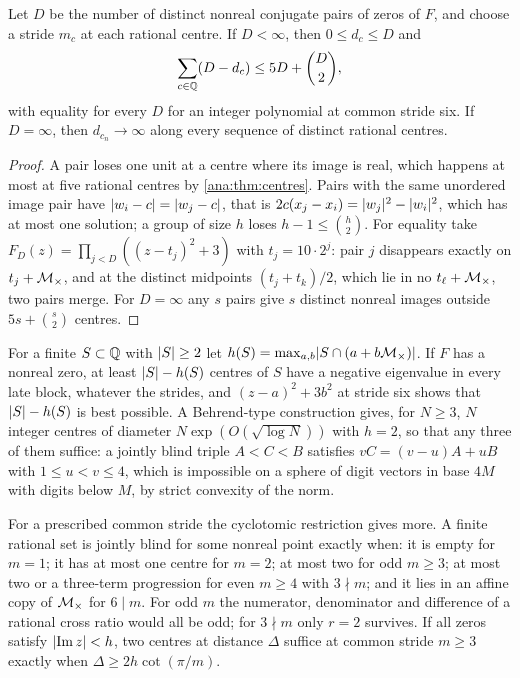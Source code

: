 \begin{theorem}\label{ana:thm:hankelloss}
Let $D$ be the number of distinct nonreal conjugate pairs of zeros of $F$, and choose a stride
$m_c$ at each rational centre. If $D<\infty$, then $0\le d_c\le D$ and
\[
 \sum_{c\in\mathbb{Q}}(D-d_c)\le5D+\binom D2,
\]
with equality for every $D$ for an integer polynomial at common stride six. If $D=\infty$,
then $d_{c_n}\to\infty$ along every sequence of distinct rational centres.
\end{theorem}

\begin{proof}
A pair loses one unit at a centre where its image is real, which happens at most at five
rational centres by \cref{ana:thm:centres}. Pairs with the same unordered image pair have
$\lvert w_i-c\rvert=\lvert w_j-c\rvert$, that is $2c(x_j-x_i)=\lvert w_j\rvert^2-\lvert w_i\rvert^2$, which has at most one
solution; a group of size $h$ loses $h-1\le\binom h2$. For equality take
$F_D(z)=\prod_{j<D}((z-t_j)^2+3)$ with $t_j=10\cdot2^j$: pair $j$ disappears exactly on
$t_j+\mathcal{M}_\times$, and at the distinct midpoints $(t_j+t_k)/2$, which lie in no $t_\ell+\mathcal{M}_\times$,
two pairs merge. For $D=\infty$ any $s$ pairs give $s$ distinct nonreal images outside
$5s+\binom s2$ centres.
\end{proof}

For a finite $S\subset\mathbb{Q}$ with $\lvert S\rvert\ge2$ let
$h(S)=\max_{a,b}\lvert S\cap(a+b\mathcal{M}_\times)\rvert$. If $F$ has a nonreal zero, at least
$\lvert S\rvert-h(S)$ centres of $S$ have a negative eigenvalue in every late block, whatever the
strides, and $(z-a)^2+3b^2$ at stride six shows that $\lvert S\rvert-h(S)$ is best possible. A
Behrend-type construction \cite{Behrend1946Sets} gives, for $N\ge3$, $N$ integer centres of
diameter $N\exp(O(\sqrt{\log N}))$ with $h=2$, so that any three of them suffice: a jointly blind
triple $A<C<B$ satisfies $vC=(v-u)A+uB$ with $1\le u<v\le4$, which is impossible on a sphere of
digit vectors in base $4M$ with digits below $M$, by strict convexity of the norm.

For a prescribed common stride the cyclotomic restriction gives more. A finite rational set is
jointly blind for some nonreal point exactly when: it is empty for $m=1$; it has at most one
centre for $m=2$; at most two for odd $m\ge3$; at most two or a three-term progression for
even $m\ge4$ with $3\nmid m$; and it lies in an affine copy of $\mathcal{M}_\times$ for $6\mid m$. For odd
$m$ the numerator, denominator and difference of a rational cross ratio would all be odd; for
$3\nmid m$ only $r=2$ survives. If all zeros satisfy $\lvert\operatorname{Im} z\rvert<h$, two centres at distance
$\Delta$ suffice at common stride $m\ge3$ exactly when $\Delta\ge2h\cot(\pi/m)$.

